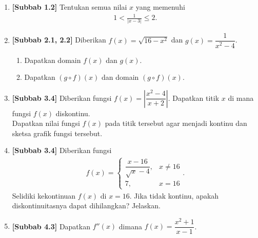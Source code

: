 \documentclass[10pt,openany,a4paper]{article}
\theoremstyle{definition}
\theoremstyle{definition}
\theoremstyle{plain}
\begin{document}
\begin{enumerate}
    \item \textbf{[Subbab 1.2]} Tentukan semua nilai $x$ yang memenuhi
    \begin{align*}
        1<\frac{1}{|x-3|}\leq 2.
    \end{align*}

    \item \textbf{[Subbab 2.1, 2.2]} Diberikan $f(x)=\sqrt{16-x^2}$ dan $g(x)=\dfrac{1}{x^2-4}$.
    \begin{enumerate}
        \item Dapatkan domain $f(x)$ dan $g(x)$.
        \item Dapatkan $(g\circ f)(x)$ dan domain $(g\circ f)(x)$.
    \end{enumerate}

    \item \textbf{[Subbab 3.4]} Diberikan fungsi $f(x)=\left|\dfrac{x^2-4}{x+2}\right|$. Dapatkan titik $x$ di mana fungsi $f(x)$ diskontinu.\\
    Dapatkan nilai fungsi $f(x)$ pada titik tersebut agar menjadi kontinu dan sketsa grafik fungsi tersebut.

    \item \textbf{[Subbab 3.4]} Diberikan fungsi
    \begin{align*}
        f(x)=\begin{cases}
            \dfrac{x-16}{\sqrt{x}-4}, & x\neq 16\\
            7, & x=16
        \end{cases}.
    \end{align*}
    Selidiki kekontinuan $f(x)$ di $x=16$. Jika tidak kontinu, apakah diskontinuitasnya dapat dihilangkan? Jelaskan.

    \item \textbf{[Subbab 4.3]} Dapatkan $f''(x)$ dimana $f(x)=\dfrac{x^2+1}{x-1}$.
\end{enumerate}

\newpage
\end{document}
